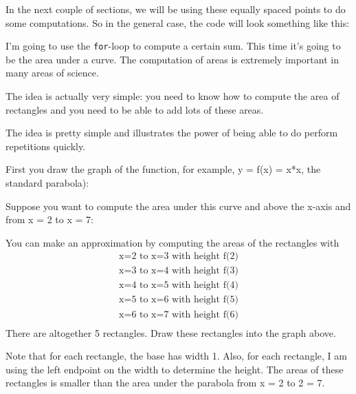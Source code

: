In the next couple of sections, we will be using these equally spaced
points to do some computations. So in the general case, the code will
look something like this:

\newpage{}

I'm going to use the \texttt{for}-loop to compute a certain sum.
This time it's going to be the area under a curve. The computation of areas is extremely important in many areas of science.

The idea is actually very simple: you need to know how to compute the area of rectangles and you need to be able to add lots of these areas.

The idea is pretty simple and illustrates the power of being able to do perform repetitions quickly.

First you draw the graph of the function, for example, y = f(x) = x*x, the standard parabola):


Suppose you want to compute the area under this curve and above the
x-axis and from x = 2 to x = 7:


You can make an approximation by computing the areas of the rectangles
with
\begin{align*}
\text{x=2 to x=3 with height f(2)}\\
\text{x=3 to x=4 with height f(3)}\\
\text{x=4 to x=5 with height f(4)}\\
\text{x=5 to x=6 with height f(5)}\\
\text{x=6 to x=7 with height f(6)}\\
\end{align*}
There are altogether 5 rectangles. Draw these rectangles into the graph
above.


Note that for each rectangle, the base has width 1. Also, for each
rectangle, I am using the left endpoint on the width to determine the
height. The areas of these rectangles is smaller than the area under the
parabola from x = 2 to 2 = 7.

